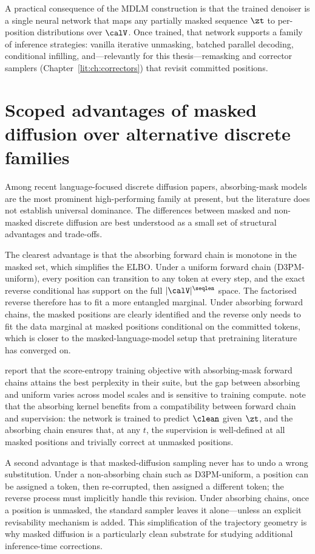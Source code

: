 A practical consequence of the MDLM construction is that the trained
denoiser is a single neural network that maps any partially masked sequence
$\zt$ to per-position distributions over $\calV$. Once trained, that
network supports a family of inference strategies: vanilla iterative
unmasking, batched parallel decoding, conditional infilling, and---relevantly
for this thesis---remasking and corrector samplers
(Chapter~\ref{lit:ch:correctors}) that revisit committed positions.

\section{Scoped advantages of masked diffusion over alternative discrete
families}
\label{lit:sec:masked-advantages}

Among recent language-focused discrete diffusion papers, absorbing-mask
models are the most prominent high-performing family at present, but the
literature does not establish universal dominance. The differences
between masked and non-masked discrete diffusion are best understood as a
small set of structural advantages and trade-offs.

The clearest advantage is that the absorbing forward chain is monotone in
the masked set, which simplifies the ELBO. Under a uniform forward chain
(D3PM-uniform), every position can transition to any token at every step,
and the exact reverse conditional has support on the full
$|\calV|^{\seqlen}$ space. The factorised reverse therefore has to fit a
more entangled marginal. Under absorbing forward chains, the masked
positions are clearly identified and the reverse only needs to fit the data
marginal at masked positions conditional on the committed tokens, which is
closer to the masked-language-model setup that pretraining literature has
converged on.

\textcite{lou2024sedd} report that the score-entropy training objective
with absorbing-mask forward chains attains the best perplexity in their
suite, but the gap between absorbing and uniform varies across model scales
and is sensitive to training compute. \textcite{austin2021d3pm} note that
the absorbing kernel benefits from a compatibility between forward chain
and supervision: the network is trained to predict $\clean$ given $\zt$,
and the absorbing chain ensures that, at any $t$, the supervision is
well-defined at all masked positions and trivially correct at unmasked
positions.

A second advantage is that masked-diffusion sampling never has to undo a
wrong substitution. Under a non-absorbing chain such as D3PM-uniform, a
position can be assigned a token, then re-corrupted, then assigned a
different token; the reverse process must implicitly handle this revision.
Under absorbing chains, once a position is unmasked, the standard sampler
leaves it alone---unless an explicit revisability mechanism is added. This
simplification of the trajectory geometry is why masked diffusion is a
particularly clean substrate for studying additional inference-time
corrections.

